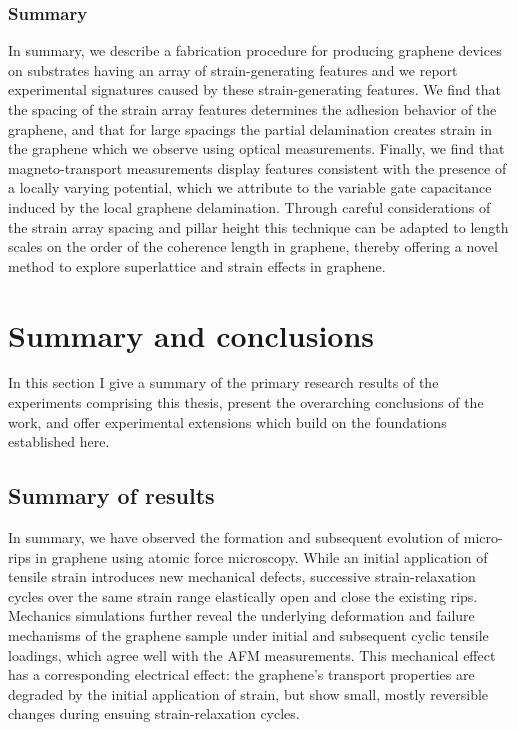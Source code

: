 \documentclass[edeposit,fullpage,draftthesis]{uiucthesis2009}
\begin{document}
            
    \subsection{Summary}
    
            In summary, we describe a fabrication procedure for producing graphene devices on
            substrates having an array of strain-generating features and we report experimental signatures
            caused by these strain-generating features. We find that the spacing of the strain array features
            determines the adhesion behavior of the graphene, and that for large spacings the partial
            delamination creates strain in the graphene which we observe using optical measurements. 
            Finally, we find that magneto-transport measurements
            display features consistent with the presence of a locally varying potential, which we attribute to the 
            variable gate capacitance induced by the local graphene delamination. 
            Through careful considerations of the strain array spacing and pillar height
            this technique can be adapted to length scales on the order of the coherence length in
            graphene, thereby offering a novel method to explore superlattice and strain effects in graphene.
            


\chapter{Summary and conclusions}

    In this section I give a summary of the primary research results of the experiments comprising this thesis, 
    present the overarching conclusions of the work, 
    and offer experimental extensions which build on the foundations established here.
    
    \section{Summary of results}
     
            In summary, we have observed the formation and subsequent evolution of
            micro-rips in graphene using atomic force microscopy. While an initial
            application of tensile strain introduces new mechanical defects, successive
            strain-relaxation cycles over the same strain range elastically open and close
            the existing rips. Mechanics simulations further reveal the underlying
            deformation and failure mechanisms of the graphene sample under initial and
            subsequent cyclic tensile loadings, which agree well with the AFM measurements.
            This mechanical effect has a corresponding electrical effect: the graphene's
            transport properties are degraded by the initial application of strain, but
            show small, mostly reversible changes during ensuing strain-relaxation cycles.
            
\end{document}
